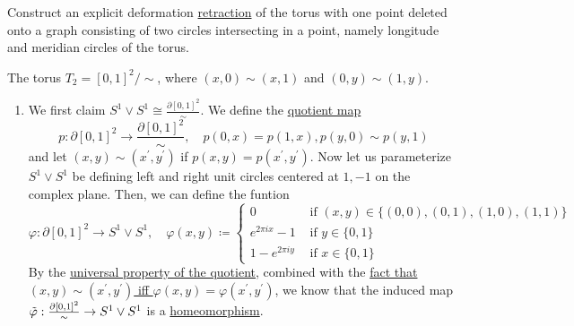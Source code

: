 	\begin{exercise}[Hatcher 0.1]
		Construct an explicit deformation \hyperref[def:retraction]{retraction} of the torus with one point deleted onto a graph consisting of two circles intersecting in a point, namely longitude and meridian circles of the torus.
	\end{exercise}
	\begin{solution}
		The torus $T_2 = [0, 1]^2 /\sim$, where $(x, 0) \sim (x, 1)$ and $(0, y) \sim (1, y)$. 
		\begin{enumerate}
		  \item We first claim $S^1 \vee S^1 \cong \frac{\partial [0, 1]^2}{\sim}$. We define the \hyperref[pst-def:quotient-map]{quotient map} 
				\begin{equation}
					p: \partial [0, 1]^2 \to \frac{\partial [0, 1]^2}{\sim}, \quad
					p(0, x) = p(1, x), p(y, 0) \sim p(y, 1)
				\end{equation}
				and let $(x, y) \sim (x^\prime, y^\prime)$ if $p(x, y) = p(x^\prime, y^\prime)$. Now let us parameterize $S^1 \vee S^1$ be defining left and right unit circles centered at $1, -1$ on the complex plane. Then, we can define the funtion 
				\begin{equation}
					\varphi: \partial [0, 1]^2 \to S^1 \vee S^1, \quad \varphi(x, y) \coloneqq \begin{cases} 
						0 & \text{ if } (x, y) \in \{(0, 0), (0, 1), (1, 0), (1, 1)\} \\ 
						e^{2\pi i x} - 1 & \text{ if } y \in \{0, 1\} \\
						1 - e^{2 \pi i y} & \text{ if } x \in \{0, 1\}
					\end{cases}
				\end{equation}
				By the \hyperref[pst-thm:universal_quotient]{universal property of the quotient}, combined with the \hyperref[pst-thm:quotient_homeomorphism]{fact that $(x, y) \sim (x^\prime, y^\prime)$ iff $\varphi(x, y) = \varphi(x^\prime, y^\prime)$}, we know that the induced map $\Tilde{\varphi}: \frac{\partial [0, 1]^2}{\sim} \to S^1 \vee S^1$ is a \hyperref[pst-def:homeomorphism]{homeomorphism}. 

				\begin{figure}[H]
					\centering 
				\end{figure}


\end{enumerate}
\end{solution}
